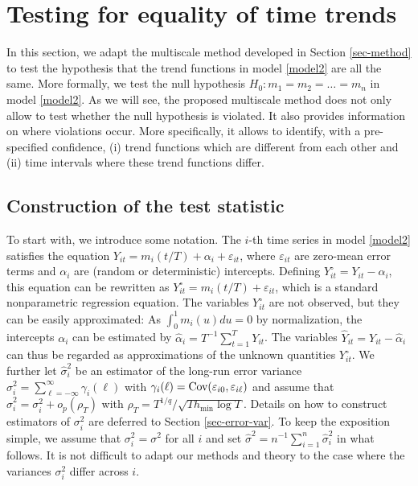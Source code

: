\section{Testing for equality of time trends}\label{sec-test-equality}


In this section, we adapt the multiscale method developed in Section \ref{sec-method} to test the hypothesis that the trend functions in model \eqref{model2} are all the same. More formally, we test the null hypothesis $H_0: m_1 = m_2 = \ldots = m_n$ in model \eqref{model2}. As we will see, the proposed multiscale method does not only allow to test whether the null hypothesis is violated. It also provides information on where violations occur. More specifically, it allows to identify, with a pre-specified confidence, (i) trend functions which are different from each other and (ii) time intervals where these trend functions differ.


\subsection{Construction of the test statistic}\label{subsec-test-equality-stat}


To start with, we introduce some notation. The $i$-th time series in model \eqref{model2} satisfies the equation $Y_{it} = m_i(t/T) + \alpha_i + \varepsilon_{it}$, where $\varepsilon_{it}$ are zero-mean error terms and $\alpha_i$ are (random or deterministic) intercepts. Defining $Y_{it}^\circ = Y_{it} - \alpha_i$, this equation can be rewritten as $Y_{it}^\circ = m_i(t/T) + \varepsilon_{it}$, which is a standard nonparametric regression equation. The variables $Y_{it}^\circ$ are not observed, but they can be easily approximated: As $\int_0^1 m_i(u) du = 0$ by normalization, the intercepts $\alpha_i$ can be estimated by $\widehat{\alpha}_i = T^{-1} \sum_{t=1}^T Y_{it}$. The variables $\widehat{Y}_{it} = Y_{it} - \widehat{\alpha}_i$ can thus be regarded as approximations of the unknown quantities $Y_{it}^\circ$. We further let $\widehat{\sigma}_i^2$ be an estimator of the long-run error variance $\sigma_i^2 = \sum\nolimits_{\ell=-\infty}^{\infty} \gamma_i(\ell)$ with $\gamma_i(\ell) = \textnormal{Cov}(\varepsilon_{i0}, \varepsilon_{i\ell})$ and assume that $\widehat{\sigma}_i^2 = \sigma_i^2 + o_p(\rho_T)$ with $\rho_T = T^{1/q}/\sqrt{T h_{\min} \log T}$. Details on how to construct estimators of $\sigma_i^2$ are deferred to Section \ref{sec-error-var}. To keep the exposition simple, we assume that $\sigma_i^2 = \sigma^2$ for all $i$ and set $\widehat{\sigma}^2 = n^{-1} \sum_{i=1}^n \widehat{\sigma}_i^2$ in what follows. It is not difficult to adapt our methods and theory to the case where the variances $\sigma_i^2$ differ across $i$. 


